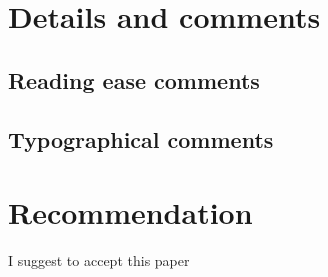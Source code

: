 \documentclass[12pt]{article}
\begin{document}
\section*{Details and comments}


\subsection*{Reading ease comments}

\begin{itemize}

\end{itemize}


\subsection*{Typographical comments}

\begin{itemize}

\end{itemize}

\section*{Recommendation}
I suggest to accept this paper 





\end{document}
